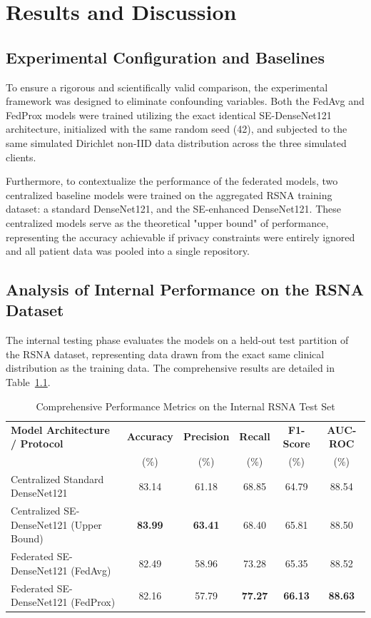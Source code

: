 \documentclass[12pt,a4paper]{report}
\begin{document}
\chapter{Results and Discussion}

\section{Experimental Configuration and Baselines}

To ensure a rigorous and scientifically valid comparison, the experimental framework was designed to eliminate confounding variables. Both the FedAvg and FedProx models were trained utilizing the exact identical SE-DenseNet121 architecture, initialized with the same random seed (42), and subjected to the same simulated Dirichlet non-IID data distribution across the three simulated clients. 

Furthermore, to contextualize the performance of the federated models, two centralized baseline models were trained on the aggregated RSNA training dataset: a standard DenseNet121, and the SE-enhanced DenseNet121. These centralized models serve as the theoretical "upper bound" of performance, representing the accuracy achievable if privacy constraints were entirely ignored and all patient data was pooled into a single repository.

\section{Analysis of Internal Performance on the RSNA Dataset}

The internal testing phase evaluates the models on a held-out test partition of the RSNA dataset, representing data drawn from the exact same clinical distribution as the training data. The comprehensive results are detailed in Table~\ref{tab:rsna_results}.

\begin{table}[H]
\centering
\caption{Comprehensive Performance Metrics on the Internal RSNA Test Set}
\label{tab:rsna_results}
\begin{tabular}{lccccc}
\toprule
\textbf{Model Architecture / Protocol} & \textbf{Accuracy} & \textbf{Precision} & \textbf{Recall} & \textbf{F1-Score} & \textbf{AUC-ROC}\\
 & (\%) & (\%) & (\%) & (\%) & (\%)\\
\midrule
Centralized Standard DenseNet121 & 83.14 & 61.18 & 68.85 & 64.79 & 88.54\\
Centralized SE-DenseNet121 (Upper Bound) & \textbf{83.99} & \textbf{63.41} & 68.40 & 65.81 & 88.50\\
Federated SE-DenseNet121 (FedAvg) & 82.49 & 58.96 & 73.28 & 65.35 & 88.52\\
Federated SE-DenseNet121 (FedProx) & 82.16 & 57.79 & \textbf{77.27} & \textbf{66.13} & \textbf{88.63}\\
\bottomrule
\end{tabular}
\end{table}
\end{document}
